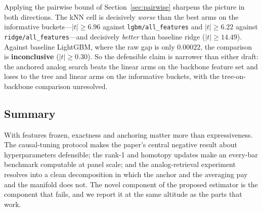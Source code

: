 Applying the pairwise bound of Section~\ref{sec:pairwise} sharpens the picture
in both directions. The kNN cell is decisively \emph{worse} than the best arms
on the informative buckets---$|t| \ge 6.96$ against \texttt{lgbm/all\_features}
and $|t| \ge 6.22$ against \texttt{ridge/all\_features}---and decisively
\emph{better} than baseline ridge ($|t| \ge 14.49$). Against baseline LightGBM,
where the raw gap is only $0.00022$, the comparison is \textbf{inconclusive}
($|t| \ge 0.30$). So the defensible claim is narrower than either draft: the
anchored analog search beats the linear arms on the backbone feature set and
loses to the tree and linear arms on the informative buckets, with the
tree-on-backbone comparison unresolved.

\subsection{Summary}
\label{sec:algo_summary}

With features frozen, exactness and anchoring matter more than expressiveness.
The causal-tuning protocol makes the paper's central negative result about
hyperparameters defensible; the rank-1 and homotopy updates make an every-bar
benchmark computable at panel scale; and the analog-retrieval experiment
resolves into a clean decomposition in which the anchor and the averaging pay
and the manifold does not. The novel component of the proposed estimator is
the component that fails, and we report it at the same altitude as the parts
that work.
